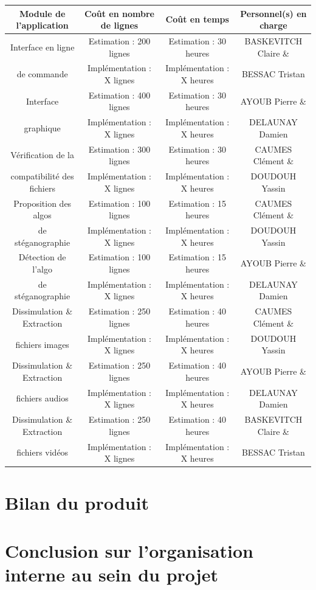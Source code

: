 \documentclass[11pt]{article}
\begin{document}
\small
\hspace{-1cm}
\begin{tabular}{|c|c|c|c|}
  \hline
  \textbf{Module de l'application} & \textbf{Coût en nombre de lignes} & \textbf{Coût en temps} & \textbf{Personnel(s) en charge} \\
  \hline
    Interface en ligne & Estimation : 200 lignes & Estimation : 30 heures & BASKEVITCH Claire \& \\ 
    de commande & Implémentation : X lignes & Implémentation : X heures & BESSAC Tristan \\
  \hline
  Interface & Estimation : 400 lignes & Estimation : 30 heures & AYOUB Pierre \& \\
  graphique & Implémentation : X lignes & Implémentation : X heures & DELAUNAY Damien \\
  \hline
  Vérification de la & Estimation : 300 lignes & Estimation : 30 heures& CAUMES Clément \& \\
   compatibilité des fichiers & Implémentation : X lignes & Implémentation : X heures & DOUDOUH Yassin \\
  \hline
    Proposition des algos & Estimation : 100 lignes & Estimation : 15 heures & CAUMES Clément \& \\
   de stéganographie & Implémentation : X lignes & Implémentation : X heures & DOUDOUH Yassin \\
  \hline
    Détection de l'algo & Estimation : 100 lignes & Estimation : 15 heures & AYOUB Pierre \& \\
   de stéganographie & Implémentation : X lignes & Implémentation : X heures & DELAUNAY Damien \\
  \hline
  Dissimulation \& Extraction & Estimation : 250 lignes & Estimation : 40 heures & CAUMES Clément \& \\
   fichiers images & Implémentation : X lignes & Implémentation : X heures & DOUDOUH Yassin \\
  \hline
  Dissimulation \& Extraction & Estimation : 250 lignes & Estimation : 40 heures & AYOUB Pierre \& \\
   fichiers audios & Implémentation : X lignes & Implémentation : X heures & DELAUNAY Damien \\
     \hline
  Dissimulation \& Extraction & Estimation : 250 lignes & Estimation : 40 heures & BASKEVITCH Claire \& \\
   fichiers vidéos & Implémentation : X lignes & Implémentation : X heures & BESSAC Tristan \\
  \hline
\end{tabular}
\normalsize

\section{Bilan du produit}

\section{Conclusion sur l'organisation interne au sein du projet}
\end{document}
